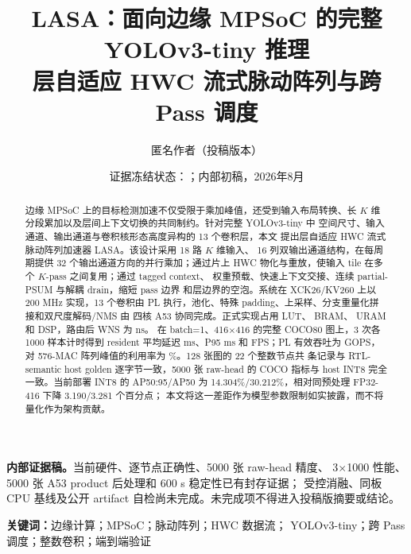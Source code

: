 \documentclass[UTF8,zihao=-4,a4paper,fontset=windows]{ctexart}
\title{\bfseries\Large LASA：面向边缘 MPSoC 的完整 YOLOv3-tiny 推理\\[0.35em]
层自适应 HWC 流式脉动阵列与跨 Pass 调度}
\author{匿名作者（投稿版本）}
\date{证据冻结状态：\EvidenceSourceKind；内部初稿，2026年8月}
\newcommand{\LASA}{\textsc{LASA}}
\newcommand{\Kpass}{$K$-pass}
\begin{document}
\maketitle

\begin{center}
\colorbox{LasaPending}{\parbox{0.92\linewidth}{\centering
\textbf{内部证据稿。}当前硬件、逐节点正确性、5000 张 raw-head 精度、
3$\times$1000 性能、5000 张 A53 product 后处理和 600 s 稳定性已有封存证据；
受控消融、同板 CPU 基线及公开 artifact
自检尚未完成。未完成项不得进入投稿版摘要或结论。}}
\end{center}

\begin{abstract}
边缘 MPSoC 上的目标检测加速不仅受限于乘加峰值，还受到输入布局转换、长
$K$ 维分段累加以及层间上下文切换的共同制约。针对完整 YOLOv3-tiny 中
空间尺寸、输入通道、输出通道与卷积核形态高度异构的 13 个卷积层，本文
提出层自适应 HWC 流式脉动阵列加速器 \LASA。该设计采用 18 路 $K$ 维输入、
16 列双输出通道结构，在每周期提供 32 个输出通道方向的并行乘加；通过片上
HWC 物化与重放，使输入 tile 在多个 \Kpass{} 之间复用；通过 tagged context、
权重预载、快速上下文交接、连续 partial-PSUM 与解耦 drain，缩短 pass 边界
和层边界的空泡。系统在 XCK26/KV260 上以 200 MHz 实现，13 个卷积由 PL
执行，池化、特殊 padding、上采样、分支重量化拼接和双尺度解码/NMS 由
四核 A53 协同完成。正式实现占用 \LUTCount{} LUT、\BRAMCount{} BRAM、
\URAMCount{} URAM 和 \DSPCount{} DSP，路由后 WNS 为 \WNSValue{} ns。
在 batch=1、416$\times$416 的完整 COCO80 图上，3 次各 1000 样本计时得到
resident 平均延迟 \ResidentMeanMs{} ms、P95 \ResidentPNinetyFiveMs{} ms 和
\ResidentFPS{} FPS；PL 有效吞吐为 \PLEffectiveGOPS{} GOPS，对 576-MAC
阵列峰值的利用率为 \ArrayUtilization{}\%。128 张图的 22 个整数节点共
\NodeRecords{} 条记录与 RTL-semantic host golden 逐字节一致，5000 张
raw-head 的 COCO 指标与 host INT8 完全一致。当前部署 INT8 的 AP50:95/AP50
为 14.304\%/30.212\%，相对同预处理 FP32-416 下降 3.190/3.281 个百分点；
本文将这一差距作为模型参数限制如实披露，而不将量化作为架构贡献。
\end{abstract}

\noindent\textbf{关键词：}边缘计算；MPSoC；脉动阵列；HWC 数据流；
YOLOv3-tiny；跨 Pass 调度；整数卷积；端到端验证











\appendix


\nocite{*}


\end{document}

